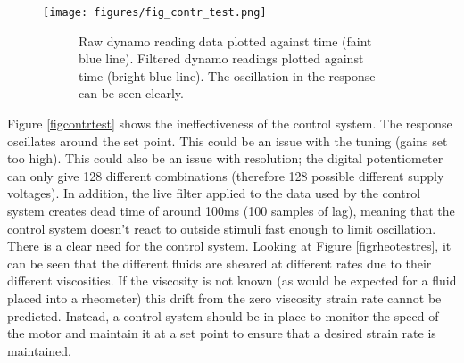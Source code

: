 \documentclass[twoside,a4]{report}
\def\br{\newline \newline \noindent}
\begin{document}
	\begin{figure}[!htb]
		\centering
		\texttt{[image: figures/fig\_contr\_test.png]}
		\caption{Controller Test}
		\label{figcontrtest}
		\begin{subfigure}{0.6\textwidth}
			\footnotesize Raw dynamo reading data plotted against time (faint blue line). Filtered dynamo readings plotted against time (bright blue line). The oscillation in the response can be seen clearly.
		\end{subfigure}
	\end{figure}
	
	\noindent
	Figure \ref{figcontrtest} shows the ineffectiveness of the control system. The response oscillates around the set point. This could be an issue with the tuning (gains set too high). This could also be an issue with resolution; the digital potentiometer can only give 128 different combinations (therefore 128 possible different supply voltages). In addition, the live filter applied to the data used by the control system creates dead time of around 100ms (100 samples of lag), meaning that the control system doesn't react to outside stimuli fast enough to limit oscillation. 
	\br
	There is a clear need for the control system. Looking at Figure \ref{figrheotestres}, it can be seen that the different fluids are sheared at different rates due to their different viscosities. If the viscosity is not known (as would be expected for a fluid placed into a rheometer) this drift from the zero viscosity strain rate cannot be predicted. Instead, a control system should be in place to monitor the speed of the motor and maintain it at a set point to ensure that a desired strain rate is maintained.
\end{document}
